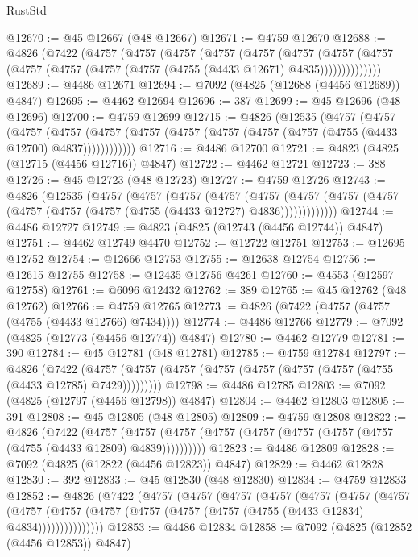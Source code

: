 \begin{lexlean}{RustStd}
\begin{coremodule}
@12670 := @45 @12667 (@48 @12667)
@12671 := @4759 @12670
@12688 := @4826
    (@7422
      (@4757
        (@4757
          (@4757
            (@4757
              (@4757
                (@4757
                  (@4757
                    (@4757 (@4757 (@4757 (@4757 (@4757 (@4755 (@4433 @12671) @4835))))))))))))))
@12689 := @4486 @12671
@12694 := @7092 (@4825 (@12688 (@4456 @12689)) @4847)
@12695 := @4462 @12694
@12696 := 387
@12699 := @45 @12696 (@48 @12696)
@12700 := @4759 @12699
@12715 := @4826
    (@12535
      (@4757
        (@4757
          (@4757
            (@4757 (@4757 (@4757 (@4757 (@4757 (@4757 (@4757 (@4755 (@4433 @12700) @4837))))))))))))
@12716 := @4486 @12700
@12721 := @4823 (@4825 (@12715 (@4456 @12716)) @4847)
@12722 := @4462 @12721
@12723 := 388
@12726 := @45 @12723 (@48 @12723)
@12727 := @4759 @12726
@12743 := @4826
    (@12535
      (@4757
        (@4757
          (@4757
            (@4757
              (@4757
                (@4757 (@4757 (@4757 (@4757 (@4757 (@4757 (@4755 (@4433 @12727) @4836)))))))))))))
@12744 := @4486 @12727
@12749 := @4823 (@4825 (@12743 (@4456 @12744)) @4847)
@12751 := @4462 @12749 @4470
@12752 := @12722 @12751
@12753 := @12695 @12752
@12754 := @12666 @12753
@12755 := @12638 @12754
@12756 := @12615 @12755
@12758 := @12435 @12756 @4261
@12760 := @4553 (@12597 @12758)
@12761 := @6096 @12432
@12762 := 389
@12765 := @45 @12762 (@48 @12762)
@12766 := @4759 @12765
@12773 := @4826 (@7422 (@4757 (@4757 (@4755 (@4433 @12766) @7434))))
@12774 := @4486 @12766
@12779 := @7092 (@4825 (@12773 (@4456 @12774)) @4847)
@12780 := @4462 @12779
@12781 := 390
@12784 := @45 @12781 (@48 @12781)
@12785 := @4759 @12784
@12797 := @4826
    (@7422 (@4757 (@4757 (@4757 (@4757 (@4757 (@4757 (@4757 (@4755 (@4433 @12785) @7429)))))))))
@12798 := @4486 @12785
@12803 := @7092 (@4825 (@12797 (@4456 @12798)) @4847)
@12804 := @4462 @12803
@12805 := 391
@12808 := @45 @12805 (@48 @12805)
@12809 := @4759 @12808
@12822 := @4826
    (@7422
      (@4757 (@4757 (@4757 (@4757 (@4757 (@4757 (@4757 (@4757 (@4755 (@4433 @12809) @4839))))))))))
@12823 := @4486 @12809
@12828 := @7092 (@4825 (@12822 (@4456 @12823)) @4847)
@12829 := @4462 @12828
@12830 := 392
@12833 := @45 @12830 (@48 @12830)
@12834 := @4759 @12833
@12852 := @4826
    (@7422
      (@4757
        (@4757
          (@4757
            (@4757
              (@4757
                (@4757
                  (@4757
                    (@4757
                      (@4757 (@4757 (@4757 (@4757 (@4757 (@4755 (@4433 @12834) @4834)))))))))))))))
@12853 := @4486 @12834
@12858 := @7092 (@4825 (@12852 (@4456 @12853)) @4847)

\end{coremodule}
\end{lexlean}

